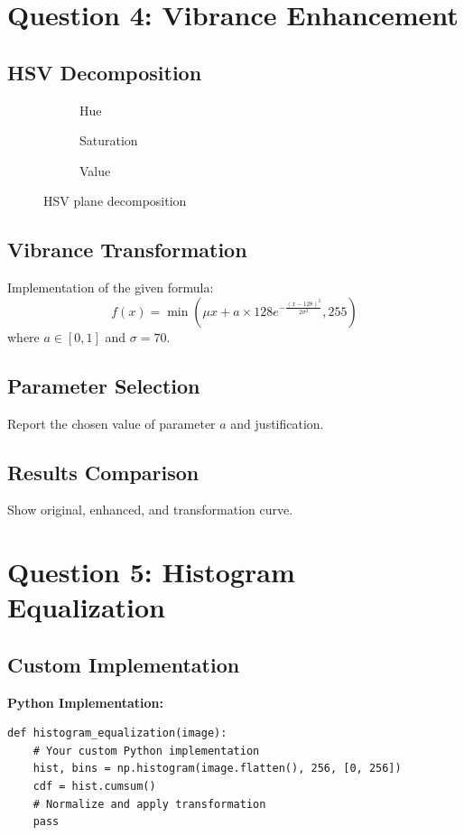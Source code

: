 \documentclass[12pt]{article}
\begin{document}
\section{Question 4: Vibrance Enhancement}
\subsection{HSV Decomposition}
\begin{figure}[H]
    \centering
    \begin{subfigure}{0.3\textwidth}
        \fbox{\rule{0pt}{1.5in}\rule{1.5in}{0pt}}
        \caption{Hue}
    \end{subfigure}
    \hfill
    \begin{subfigure}{0.3\textwidth}
        \fbox{\rule{0pt}{1.5in}\rule{1.5in}{0pt}}
        \caption{Saturation}
    \end{subfigure}
    \hfill
    \begin{subfigure}{0.3\textwidth}
        \fbox{\rule{0pt}{1.5in}\rule{1.5in}{0pt}}
        \caption{Value}
    \end{subfigure}
    \caption{HSV plane decomposition}
\end{figure}

\subsection{Vibrance Transformation}
Implementation of the given formula:
\[
f(x) = \min\left(\mu x + a \times 128 e^{-\frac{(x-128)^2}{2\sigma^2}}, 255\right)
\]
where $a \in [0,1]$ and $\sigma = 70$.

\subsection{Parameter Selection}
Report the chosen value of parameter $a$ and justification.

\subsection{Results Comparison}
Show original, enhanced, and transformation curve.

\section{Question 5: Histogram Equalization}
\subsection{Custom Implementation}
\textbf{Python Implementation:}
\begin{lstlisting}[style=pythonstyle]
def histogram_equalization(image):
    # Your custom Python implementation
    hist, bins = np.histogram(image.flatten(), 256, [0, 256])
    cdf = hist.cumsum()
    # Normalize and apply transformation
    pass
\end{lstlisting}
\end{document}
